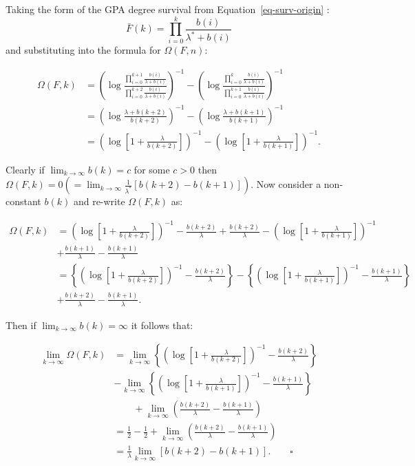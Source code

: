 \documentclass[
  sn-basic,
]{sn-jnl}
\theoremstyle{plain}
\theoremstyle{plain}
\theoremstyle{remark}
\begin{document}
Taking the form of the GPA degree survival from
Equation~\ref{eq-surv-origin} : \[
\bar F(k) = \prod_{i=0}^k\frac{b(i)}{\lambda^*+b(i)}
\] and substituting into the formula for \(\Omega(F,n)\):

\begin{align*}
\Omega(F,k)&=\left(\log\frac{\prod_{i=0}^{k+1}\frac{b(i)}{\lambda+b(i)}}{\prod_{i=0}^{k+2}\frac{b(i)}{\lambda+b(i)}}\right)^{-1}-\left(\log\frac{\prod_{i=0}^{k}\frac{b(i)}{\lambda+b(i)}}{\prod_{i=0}^{k+1}\frac{b(i)}{\lambda+b(i)}}\right)^{-1}\\
&=\left(\log\frac{\lambda+b(k+2)}{b(k+2)}\right)^{-1}-\left(\log\frac{\lambda+b(k+1)}{b(k+1)}\right)^{-1}\\
&=\left(\log\left[1+\frac{\lambda}{b(k+2)}\right]\right)^{-1}-\left(\log\left[1+\frac{\lambda}{b(k+1)}\right]\right)^{-1}.
\end{align*}

Clearly if \(\lim_{k\rightarrow\infty}b(k)=c\) for some \(c>0\) then
\(\Omega(F,k)= 0 (= \lim_{k\rightarrow\infty}\frac{1}{\lambda^{*}} [b(k+2)-b(k+1)])\).
Now consider a non-constant \(b(k)\) and re-write \(\Omega(F,k)\) as:

\begin{align*}
\Omega(F,k) &= \left(\log\left[1+\frac{\lambda}{b(k+2)}\right]\right)^{-1}-\frac{b(k+2)}{\lambda}+\frac{b(k+2)}{\lambda}-\left(\log\left[1+\frac{\lambda}{b(k+1)}\right]\right)^{-1}\\&+\frac{b(k+1)}{\lambda}  -\frac{b(k+1)}{\lambda}\\
&=\left\{ \left(\log\left[1+\frac{\lambda}{b(k+2)}\right]\right)^{-1}-\frac{b(k+2)}{\lambda}\right\} - \left\{ \left(\log\left[1+\frac{\lambda}{b(k+1)}\right]\right)^{-1}-\frac{b(k+1)}{\lambda}\right\}\\&+\frac{b(k+2)}{\lambda}-\frac{b(k+1)}{\lambda}.
\end{align*}

Then if \(\lim_{k\rightarrow\infty}b(k)=\infty\) it follows that:

\begin{align*}
\lim_{k\rightarrow\infty}\Omega(F,k) &= \lim_{k\rightarrow\infty}\left\{ \left(\log\left[1+\frac{\lambda}{b(k+2)}\right]\right)^{-1}-\frac{b(k+2)}{\lambda}\right\} \\&- \lim_{k\rightarrow\infty}\left\{ \left(\log\left[1+\frac{\lambda}{b(k+1)}\right]\right)^{-1}-\frac{b(k+1)}{\lambda}\right\}\\
&\qquad+\lim_{k\rightarrow\infty}\left(\frac{b(k+2)}{\lambda}-\frac{b(k+1)}{\lambda}\right)\\
&=\frac{1}{2}-\frac{1}{2} + \lim_{k\rightarrow\infty}\left(\frac{b(k+2)}{\lambda}-\frac{b(k+1)}{\lambda}\right)\\
&=\frac{1}{\lambda}\lim_{k\rightarrow\infty}\left[b(k+2)-b(k+1)\right].\qquad \square
\end{align*}
\end{document}
